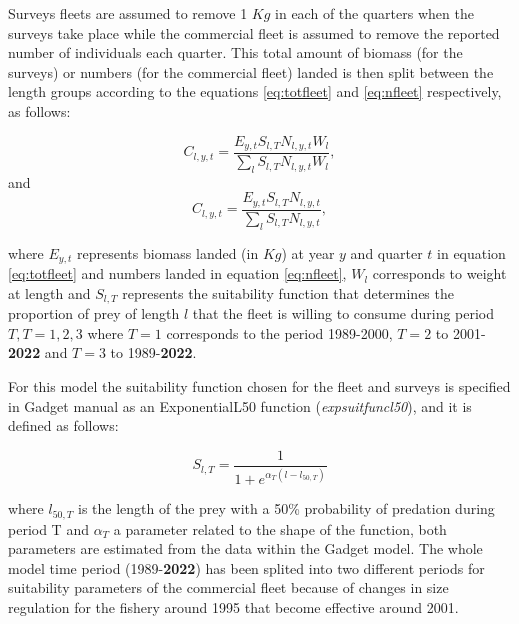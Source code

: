 \documentclass[review]{elsarticle}
\begin{document}
Surveys fleets are assumed to remove 1 $Kg$ in each of the quarters when the surveys take place while the commercial fleet is assumed to remove the reported number of individuals each quarter. This total amount of biomass (for the surveys) or numbers (for the commercial fleet) landed is then split between the length groups according to the equations \ref{eq:totfleet} and \ref{eq:nfleet}  respectively, as follows:




\begin{equation}
\label{eq:totfleet}
C_{l,y,t}  =  \frac{E_{y,t} S_{l,T} N_{l,y,t} W_{l}}{\sum\limits_l S_{l,T} N_{l,y,t} W_{l} },
\end{equation}
and
\begin{equation}
\label{eq:nfleet}
C_{l,y,t}  =  \frac{E_{y,t} S_{l,T} N_{l,y,t} }{\sum\limits_l S_{l,T} N_{l,y,t} }, 
\end{equation}

where $E_{y,t}$ represents biomass landed (in $Kg$) at year $y$ and quarter $t$ in equation \ref{eq:totfleet} and numbers landed in equation \ref{eq:nfleet}, $W_l$ corresponds to weight at length and $S_{l,T}$ represents the suitability function that determines the proportion of prey of length $l$ that the fleet is willing to consume during period $T, T=1,2,3$ where $T=1$ corresponds to the period 1989-2000, $T=2$ to 2001-\textbf{2022} and $T=3$ to 1989-\textbf{2022}.

For this model the suitability function chosen for the fleet and surveys is specified in Gadget manual as an ExponentialL50 function (\textit{expsuitfuncl50}), and it is defined as follows:

\begin{equation}
\label{eq:sut}
S_{l,T}  =  \frac{1}{1+e^{\alpha_{T} (l-l_{50,T})}} 
\end{equation}

where $l_{50,T}$ is the length of the prey with a 50\% probability of predation during period T and $\alpha_{T}$ a parameter related to the shape of the function, both parameters are estimated from the data within the Gadget model. The whole model time period (1989-\textbf{2022}) has been splited into two different periods for suitability parameters of the commercial fleet because of changes in size regulation for the fishery around 1995 that become effective around 2001. 
\end{document}
